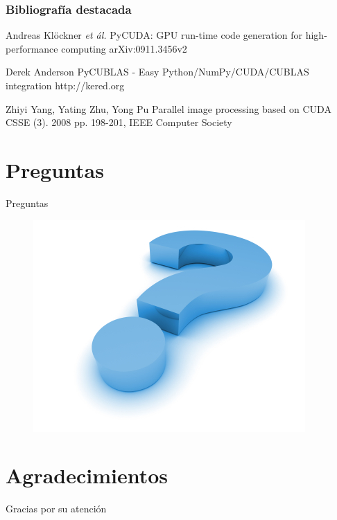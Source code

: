 \documentclass{beamer}
\begin{document}
\begin{frame}[allowframebreaks]
  \frametitle<presentation>{Bibliografía destacada}
    
  \begin{thebibliography}{10}
    
  \beamertemplatearticlebibitems

   
    Andreas Kl{\"o}ckner \emph{et ál.}
    \newblock PyCUDA: GPU run-time code generation for high-performance computing
    \newblock arXiv:0911.3456v2

    Derek Anderson
    \newblock PyCUBLAS - Easy Python/NumPy/CUDA/CUBLAS integration
    \newblock http://kered.org

    Zhiyi Yang, Yating Zhu, Yong Pu
    \newblock Parallel image processing based on CUDA
    \newblock CSSE (3). 2008 pp. 198-201, IEEE Computer Society
  \end{thebibliography}
\end{frame}


\section*{Preguntas}

\begin{frame}{Preguntas}
  \begin{figure}
    \begin{center}
      \includegraphics[width=.5\textwidth]{question.jpg}
    \end{center}
  \end{figure}
\end{frame}

\section*{Agradecimientos}

\begin{frame}
  \begin{center}
    {\Huge Gracias por su atención}
  \end{center}
\end{frame}
\end{document}
